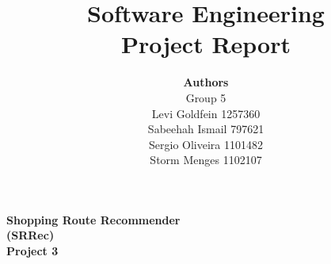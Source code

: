 \documentclass[12pt]{article}
\begin{document}
 
\title{Software Engineering\\Project Report}
\author{\textbf{Authors}\\Group 5\\Levi Goldfein 1257360\\Sabeehah Ismail 797621\\ Sergio Oliveira 1101482 \\Storm Menges 1102107}
\maketitle

\begin{center}
\LARGE
\textbf{Shopping Route Recommender\\(SRRec)\\Project 3}
\end{center}
\pagebreak



\tableofcontents
\pagebreak
\end{document}
